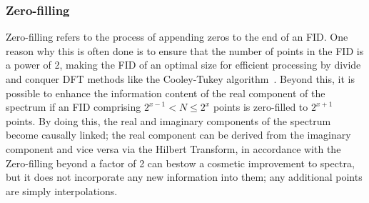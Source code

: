 \subsubsection{Zero-filling}
Zero-filling refers to the process of appending zeros to the end of an
\ac{FID}. One reason why this is often done is to ensure that the number of
points in the \ac{FID} is a power of 2, making the \ac{FID} of an optimal size
for efficient processing by divide and conquer \ac{DFT} methods like the
Cooley-Tukey algorithm~\cite{Cooley1965}. Beyond this, it is
possible to enhance the information content of the real component of the
spectrum if an \ac{FID} comprising $2^{x-1} < N \leq 2^x$ points is zero-filled
to $2^{x+1}$ points. By doing this, the real and imaginary
components of
the spectrum become causally linked; the real component can be derived from the
imaginary component and vice versa via the Hilbert Transform, in accordance
with the \label{corr:kram-kron}%
Zero-filling beyond a factor of 2 can bestow a
cosmetic improvement to spectra, but it does not incorporate any new
information into them; any additional points are simply interpolations.

